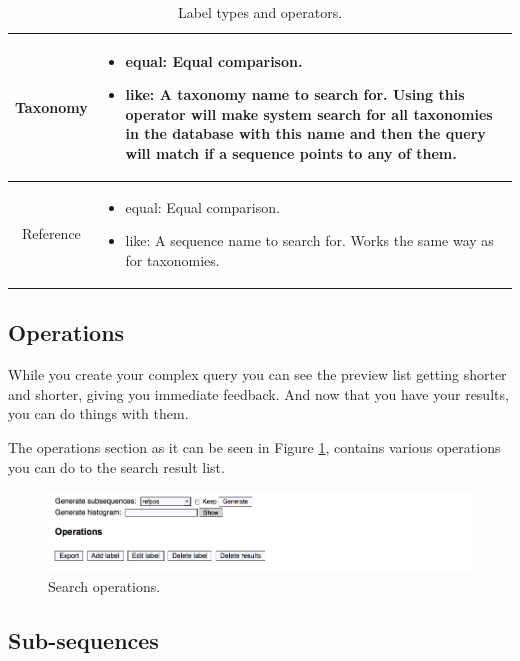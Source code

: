 \begin{table}[H]
{\begin{tabular}{ | c | p{} |}
      Taxonomy & \begin{itemize}
        \item equal: Equal comparison.
        \item like: A taxonomy name to search for. Using this operator will make system search for all
        taxonomies in the database with this name and then the query will match if a sequence points to any of them.
      \end{itemize} \\ \hline
      
      Reference & \begin{itemize}
        \item equal: Equal comparison.
        \item like: A sequence name to search for. Works the same way as for taxonomies.
      \end{itemize} \\ \hline
  \end{tabular}}
  \caption{Label types and operators.}
  \label{tbl:operators}
\end{table}

\subsection{Operations}

While you create your complex query you can see the preview list getting shorter and shorter, giving you
immediate feedback. And now that you have your results, you can do things with them.

The operations section as it can be seen in Figure \ref{fig:search2_man}, contains various operations
you can do to the search result list.

\begin{figure}[H]
  \centering
    \includegraphics[scale=0.5]{search2.png}
  \caption{Search operations.}
  \label{fig:search2_man}
\end{figure}

\subsection{Sub-sequences}

